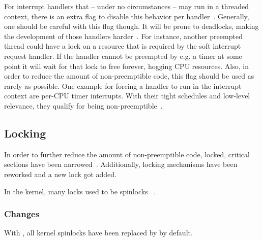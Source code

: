\documentclass[10pt,twocolumn,a4paper]{article}
\begin{document}
For interrupt handlers that -- under no circumstances -- may run in a threaded context, there is an extra flag to disable this behavior per handler~\cite{lf:irq}.
Generally, one should be careful with this flag though.
It will be prone to deadlocks, making the development of those handlers harder~\cite{mckenney_realtime_2005}.
For instance, another preempted thread could have a lock on a resource that is required by the soft interrupt request handler.
If the handler cannot be preempted by e.g. a timer at some point it will wait for that lock to free forever, hogging CPU resources.
Also, in order to reduce the amount of non-preemptible code, this flag should be used as rarely as possible.
One example for forcing a handler to run in the interrupt context are per-CPU timer interrupts.
With their tight schedules and low-level relevance, they qualify for being non-preemptible~\cite{mckenney_realtime_2005}.

\subsection{Locking}\label{subsec:locking}
In order to further reduce the amount of non-preemptible code, locked, critical sections have been narrowed~\cite{mckenney_realtime_2005}.
Additionally, locking mechanisms have been reworked and a new lock got added.

In the kernel, many locks used to be spinlocks ~\cite{lf:sleeping-spinlocks}.

\subsubsection{Changes}
With , all  kernel spinlocks have been replaced by  by default.
\end{document}
